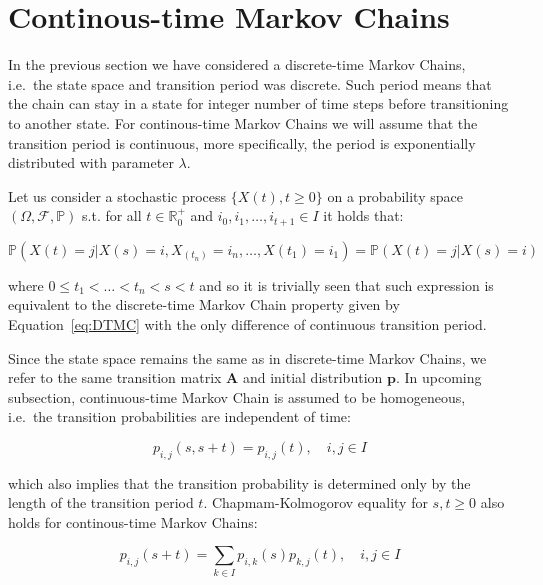 \section{Continous-time Markov Chains} 

In the previous section we have considered a discrete-time Markov Chains, i.e.\ the state space and transition period was discrete. Such period means that 
the chain can stay in a state for integer number of time steps before transitioning to another state. 
For continous-time Markov Chains we will assume that the transition period is continuous, more specifically, the period is exponentially distributed with parameter $\lambda$.

Let us consider a stochastic process $\{X(t),t \geq 0\}$ on a probability space $(\Omega,\mathcal{F},\mathbb{P})$ s.t. for all $t \in \mathbb{R}_0^+$ and $i_0,i_1,\ldots,i_{t+1} \in I$ it holds that:

\begin{equation}
\mathbb{P}(X(t)=j|X(s)=i, X_(t_n)=i_n,\ldots,X(t_1)=i_1) = \mathbb{P}(X(t)=j|X(s)=i)
\end{equation}

where $0 \leq t_1 < \ldots < t_n < s < t $ and so it is trivially seen that such expression is equivalent to the discrete-time Markov Chain property 
given by Equation~\ref{eq:DTMC} with the only difference of continuous transition period. \cite{Tolver2016}

Since the state space remains the same as in discrete-time Markov Chains, we refer to the same transition matrix $\textbf{A}$ and initial distribution $\textbf{p}$.
In upcoming subsection, continuous-time Markov Chain is assumed to be homogeneous, i.e.\ the transition probabilities are independent of time:

\begin{equation}
p_{i,j}(s,s+t) = p_{i,j}(t), \quad i,j \in I
\end{equation}

which also implies that the transition probability is determined only by the length of the transition period $t$. 
Chapmam-Kolmogorov equality for $s,t \geq 0$ also holds for continous-time Markov Chains:

\begin{equation}
p_{i,j}(s+t) = \sum\limits_{k \in I} p_{i,k}(s) p_{k,j}(t), \quad i,j \in I
\end{equation}

